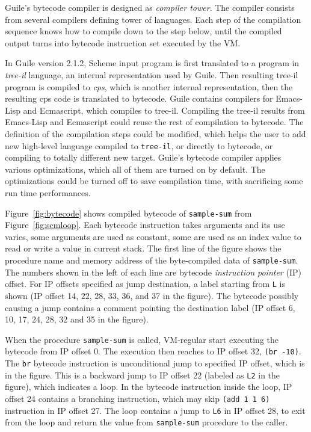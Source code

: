 \documentclass[preprint]{sigplanconf}
\begin{document}
Guile's bytecode compiler is designed as \textit{compiler tower}. The compiler
consists from several compilers defining tower of languages. Each step of the
compilation sequence knows how to compile down to the step below, until the
compiled output turns into bytecode instruction set executed by the VM.\@

In Guile version 2.1.2, Scheme input program is first translated to a program
in \textit{tree-il} language, an internal representation used by Guile. Then
resulting tree-il program is compiled to \textit{cps}, which is another
internal representation, then the resulting cps code is translated to
bytecode. Guile contains compilers for Emacs-Lisp and Ecmascript, which
compiles to tree-il. Compiling the tree-il results from Emacs-Lisp and
Ecmascript could reuse the rest of compilation to bytecode. The definition of
the compilation steps could be modified, which helps the user to add new
high-level language compiled to \texttt{tree-il}, or directly to bytecode, or
compiling to totally different new target. Guile's bytecode compiler applies
various optimizations, which all of them are turned on by default. The
optimizations could be turned off to save compilation time, with sacrificing
some run time performances.

Figure~\hyperref[fig:bytecode]{\ref{fig:bytecode}} shows compiled bytecode of
\texttt{sample-sum} from
Figure~\hyperref[fig:scmloop]{\ref{fig:scmloop}}. Each bytecode instruction
takes arguments and its use varies, some arguments are used as constant, some
are used as an index value to read or write a value in current stack. The
first line of the figure shows the procedure name and memory address of the
byte-compiled data of \texttt{sample-sum}. The numbers shown in the left of
each line are bytecode \textit{instruction pointer} (IP) offset. For IP
offsets specified as jump destination, a label starting from \texttt{L} is
shown (IP offset 14, 22, 28, 33, 36, and 37 in the figure). The bytecode
possibly causing a jump contains a comment pointing the destination label (IP
offset 6, 10, 17, 24, 28, 32 and 35 in the figure).

When the procedure \texttt{sample-sum} is called, VM-regular start executing
the bytecode from IP offset 0. The execution then reaches to IP offset 32,
\texttt{(br -10)}. The \texttt{br} bytecode instruction is unconditional jump
to specified IP offset, which is  in the figure. This is a backward jump to
IP offset 22 (labeled as \texttt{L2} in the figure), which indicates a
loop. In the bytecode instruction inside the loop, IP offset 24 contains a
branching instruction, which may skip \texttt{(add 1 1 6)} instruction in IP
offset 27. The loop contains a jump to \texttt{L6} in IP offset 28, to exit
from the loop and return the value from \texttt{sample-sum} procedure to the
caller.
\end{document}

